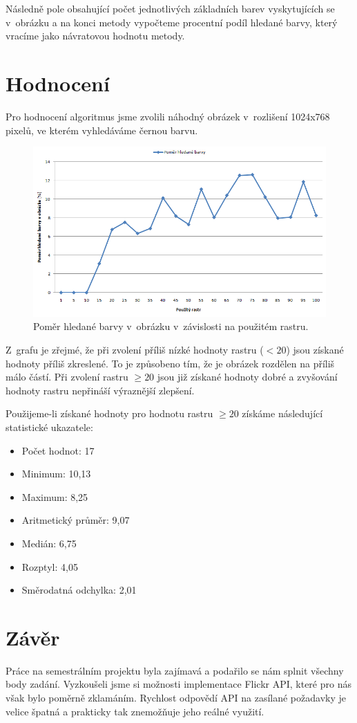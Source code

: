 \documentclass[12pt]{article}
\begin{document}
Následně pole obsahující počet jednotlivých základních barev vyskytujících se v~obrázku a na konci metody vypočteme procentní podíl hledané barvy, který vracíme jako návratovou hodnotu metody.

\section{Hodnocení}
Pro hodnocení algoritmus jsme zvolili náhodný obrázek v~rozlišení 1024x768 pixelů, ve kterém vyhledáváme černou barvu. 
\renewcommand{\figurename}{Graf}
\setcounter{figure}{0}
\begin{figure}[ht]
\centering       
\includegraphics[scale=0.6]{graf.png}
\caption{Poměr hledané barvy v~obrázku v~závislosti na použitém rastru.}
\label{graf}
\end{figure}

Z~grafu je zřejmé, že při zvolení příliš nízké hodnoty rastru ($< 20$) jsou získané hodnoty příliš zkreslené. To je způsobeno tím, že je obrázek rozdělen na příliš málo částí. Při zvolení rastru $\geq 20$ jsou již získané hodnoty dobré a zvyšování hodnoty rastru nepřináší výraznější zlepšení. 

Použijeme-li získané hodnoty pro hodnotu rastru $\geq 20$ získáme následující statistické ukazatele:
\begin{itemize}
\item Počet hodnot: 17
\item Minimum: 10,13
\item Maximum: 8,25
\item Aritmetický průměr: 9,07
\item Medián: 6,75
\item Rozptyl: 4,05
\item Směrodatná odchylka: 2,01
\end{itemize}

\section{Závěr}
Práce na semestrálním projektu byla zajímavá a podařilo se nám splnit všechny body zadání. Vyzkoušeli jsme si možnosti implementace Flickr API, které pro nás však bylo poměrně zklamáním. Rychlost odpovědí API na zasílané požadavky je velice špatná a prakticky tak znemožňuje jeho reálné využití.
\end{document}
